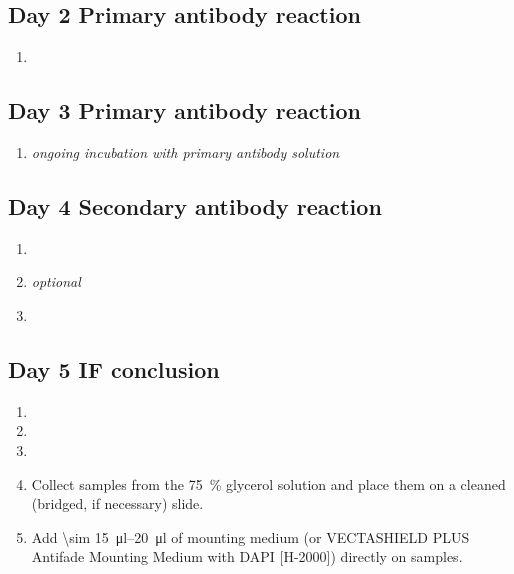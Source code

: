 \documentclass[10pt]{report}
\begin{document}
\subsection*{Day 2 \textendash{} Primary antibody reaction}
\begin{enumerate}[series = steps]
	\item {}
\end{enumerate}

\subsection*{Day 3 \textendash{} Primary antibody reaction}
\begin{enumerate}[series = steps]
	\item \textit{ongoing incubation with primary antibody solution}
\end{enumerate}

\subsection*{Day 4 \textendash{} Secondary antibody reaction}
\begin{enumerate}[series = steps]
	\item {}
	\item \textit{optional} 
	\item {}
\end{enumerate}

\subsection*{Day 5 \textendash{} IF conclusion}

\begin{enumerate}[series = steps]
	\item {}
	\item {}
	\item {}
	\item Collect samples from the \qty{75}{\percent} glycerol solution and place them on a cleaned (bridged, if necessary) slide.
	\item Add \qtyrange{\sim 15}{20}{\ul} of mounting medium (or VECTASHIELD\textregistered{} PLUS Antifade Mounting Medium with DAPI [H-2000]) directly on samples.
\end{enumerate}
\end{document}
